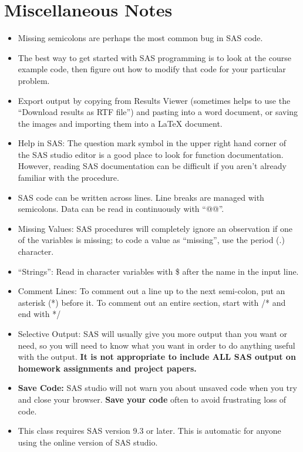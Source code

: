 \documentclass[12pt]{notes}
\begin{document}
\section{Miscellaneous Notes}
\begin{itemize}
\item Missing semicolons are perhaps the most common bug in SAS code. 
\item The best way to get started with SAS programming is to look at the course example code, then figure out how to modify that code for your particular problem. 
\item Export output by copying from Results Viewer (sometimes helps to use the ``Download results as RTF file'') and pasting into a word document, or saving the images and importing them into a LaTeX document. 
\item Help in SAS: The question mark symbol in the upper right hand corner of the SAS studio editor is a good place to look for function documentation. However, reading SAS documentation can be difficult if you aren't already familiar with the procedure.  
\item SAS code can be written across lines. Line breaks are managed with semicolons. Data can be read in continuously with ``@@''.
\item Missing Values: SAS procedures will completely ignore an observation if one of the variables is missing; to code a value as ``missing'', use the period (.) character. 
\item ``Strings'': Read in character variables with \$ after the name in the input line.
\item Comment Lines: To comment out a line up to the next semi-colon, put an asterisk (*) before it. To comment out an entire section, start with /* and end with */
\item Selective Output: SAS will usually give you more output than you want or need, so you will need to know what you want in order to do anything useful with the output. \textbf{It is not appropriate to include ALL SAS output on homework assignments and project papers.}
\item \textbf{Save Code:} SAS studio will not warn you about unsaved code when you try and close your browser. \textbf{Save your code} often to avoid frustrating loss of code. 
\item This class requires SAS version 9.3 or later. This is automatic for anyone using the online version of SAS studio.
\end{itemize}
\end{document}
